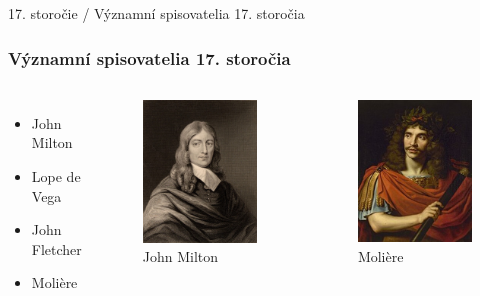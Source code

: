 \documentclass[dvipsnames]{beamer}
\begin{document}
\begin{frame}{\small 17. storočie / \Large Významní spisovatelia 17. storočia}
	\subsubsection{Významní spisovatelia 17. storočia}
	\begin{columns}

	\begin{itemize}
		\item John Milton
		\bigskip
		\item Lope de Vega
		\bigskip
		\item John Fletcher
		\bigskip
		\item Molière
	\end{itemize}
	\begin{figure}
		\includegraphics[scale=0.25]{milton}
		\caption{John Milton}
	\end{figure}%
	\begin{figure}
		\includegraphics[scale=0.25]{molier}
		\caption{Molière}
	\end{figure}

	\end{columns}
\end{frame}
\end{document}

